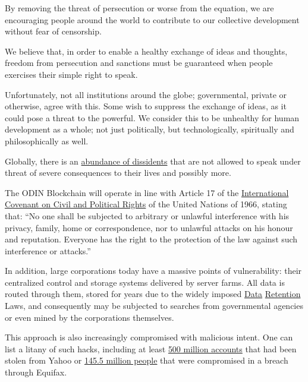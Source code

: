 \documentclass[12pt,letterpaper]{article}
\begin{document}
By removing the threat of persecution or worse from the equation, we are encouraging people around the world to contribute to our collective development without fear of censorship.

We believe that, in order to enable a healthy exchange of ideas and thoughts, freedom from persecution and sanctions must be guaranteed when people exercises their simple right to speak. 

Unfortunately, not all institutions around the globe; governmental, private or otherwise, agree with this. Some wish to suppress the exchange of ideas, as it could pose a threat to the powerful. We consider this to be unhealthy for human development as a whole; not just politically, but technologically, spiritually and philosophically as well.

Globally, there is an \href{https://foreignpolicy.com/2010/05/07/the-worlds-top-dissidents/}{abundance of dissidents} that are not allowed to speak under threat of severe consequences to their lives and possibly more.

The ODIN Blockchain will operate in line with Article 17 of the \href{https://www.ohchr.org/EN/ProfessionalInterest/Pages/CCPR.aspx}{International Covenant on Civil and Political Rights} of the United Nations of 1966, stating that: ``No one shall be subjected to arbitrary or unlawful interference with his privacy, family, home or correspondence, nor to unlawful attacks on his honour and reputation. Everyone has the right to the protection of the law against such interference or attacks.''

In addition, large corporations today have a massive points of vulnerability: their centralized control and storage systems delivered by server farms. All data is routed through them, stored for years due to the widely imposed \href{http://fra.europa.eu/en/theme/information-society-privacy-and-data-protection/data-retention}{Data} \href{https://sydney.edu.au/news-opinion/news/2017/07/31/new-data-retention-law-seriously-invades-our-privacy.html}{Retention} Laws, and consequently may be subjected to searches from governmental agencies or even mined by the corporations themselves.

This approach is also increasingly compromised with malicious intent. One can list a litany of such hacks, including at least \href{http://money.cnn.com/2016/09/22/technology/yahoo-data-breach/?iid=EL}{500 million accounts} that had been stolen from Yahoo or \href{http://money.cnn.com/2017/10/02/technology/business/equifax-million-more-impacted/index.html?iid=EL}{145.5 million people} that were compromised in a breach through Equifax.
\end{document}

